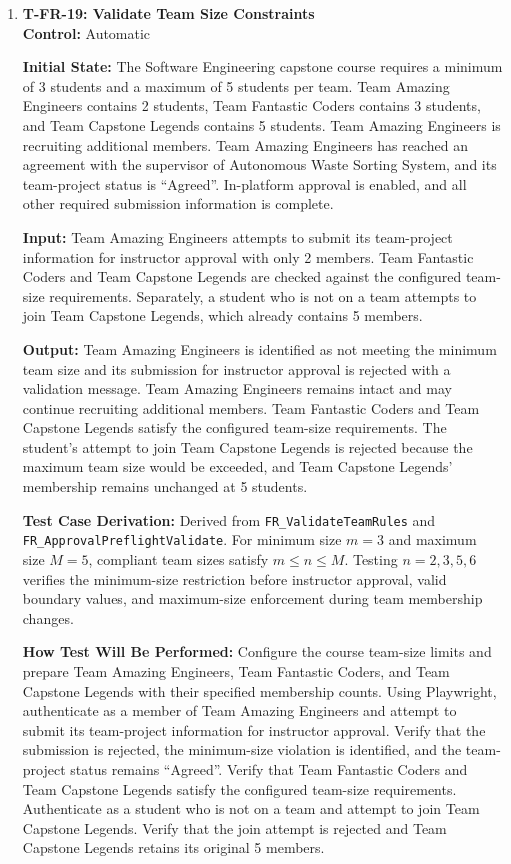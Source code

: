 \documentclass[12pt, titlepage]{article}
\begin{document}
\begin{enumerate}
\item \label{T-FR-19}\textbf{T-FR-19: Validate Team Size Constraints}\\

\textbf{Control:} Automatic

\textbf{Initial State:} The Software Engineering capstone course requires a minimum of 3 students and a maximum of 5 students per team. Team Amazing Engineers contains 2 students, Team Fantastic Coders contains 3 students, and Team Capstone Legends contains 5 students. Team Amazing Engineers is recruiting additional members. Team Amazing Engineers has reached an agreement with the supervisor of Autonomous Waste Sorting System, and its team-project status is ``Agreed''. In-platform approval is enabled, and all other required submission information is complete.

\textbf{Input:} Team Amazing Engineers attempts to submit its team-project information for instructor approval with only 2 members. Team Fantastic Coders and Team Capstone Legends are checked against the configured team-size requirements. Separately, a student who is not on a team attempts to join Team Capstone Legends, which already contains 5 members.

\textbf{Output:} Team Amazing Engineers is identified as not meeting the minimum team size and its submission for instructor approval is rejected with a validation message. Team Amazing Engineers remains intact and may continue recruiting additional members. Team Fantastic Coders and Team Capstone Legends satisfy the configured team-size requirements. The student's attempt to join Team Capstone Legends is rejected because the maximum team size would be exceeded, and Team Capstone Legends' membership remains unchanged at 5 students.

\textbf{Test Case Derivation:} Derived from \texttt{FR\_ValidateTeamRules} and \texttt{FR\_ApprovalPreflightValidate}. For minimum size $m = 3$ and maximum size $M = 5$, compliant team sizes satisfy $m \leq n \leq M$. Testing $n = 2, 3, 5, 6$ verifies the minimum-size restriction before instructor approval, valid boundary values, and maximum-size enforcement during team membership changes.

\textbf{How Test Will Be Performed:} Configure the course team-size limits and prepare Team Amazing Engineers, Team Fantastic Coders, and Team Capstone Legends with their specified membership counts. Using Playwright, authenticate as a member of Team Amazing Engineers and attempt to submit its team-project information for instructor approval. Verify that the submission is rejected, the minimum-size violation is identified, and the team-project status remains ``Agreed''. Verify that Team Fantastic Coders and Team Capstone Legends satisfy the configured team-size requirements. Authenticate as a student who is not on a team and attempt to join Team Capstone Legends. Verify that the join attempt is rejected and Team Capstone Legends retains its original 5 members.


\end{enumerate}
\end{document}
